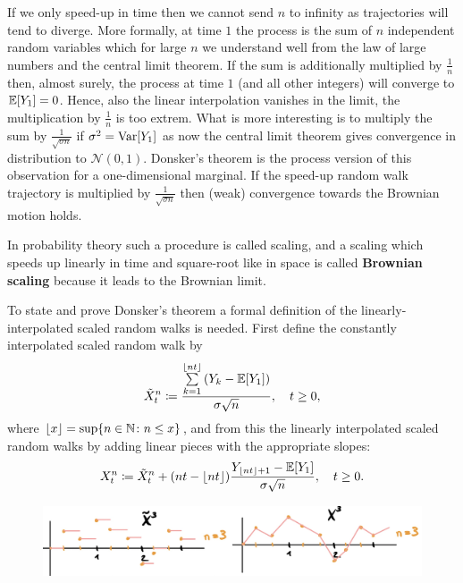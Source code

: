 If we only speed-up in time then we cannot send $n$ to infinity as trajectories will tend to diverge. More formally, at time $1$ the process is the sum of $n$ independent random variables which for large $n$ we understand well from the law of large numbers and the central limit theorem. If the sum is additionally multiplied by $\frac{1}{n}$ then, almost surely, the process at time $1$ (and all other integers) will converge to $\mathbb{E}[Y_1]=0$. Hence, also the linear interpolation vanishes in the limit, the multiplication by $\frac{1}{n}$ is too extrem. What is more interesting is to multiply the sum by $\frac{1}{\sqrt{\sigma n}}$ if $\sigma^2=\operatorname{Var}[Y_1]$ as now the central limit theorem gives convergence in distribution to $\mathcal N(0,1)$. Donsker's theorem is the process version of this observation for a one-dimensional marginal. If the speed-up random walk trajectory is multiplied by $\frac{1}{\sqrt{\sigma n}}$ then (weak) convergence towards the Brownian motion holds. 
\begin{laufmerksamkeit}
	In probability theory such a procedure is called scaling, and a scaling which speeds up linearly in time and square-root like in space is called \textbf{Brownian scaling} because it leads to the Brownian limit. 
\end{laufmerksamkeit}
To state and prove Donsker's theorem a formal definition of the linearly-interpolated scaled random walks is needed. First define the constantly interpolated scaled random walk by
	\begin{align*}
		\tilde{X}_t^n \coloneqq \frac{\sum\limits_{k=1}^{\lfloor nt \rfloor}\left( Y_k - \mathbb{E}[Y_1]\right)}{\sigma \sqrt{n}}, \quad t\geq 0,
	\end{align*}
	where $\lfloor x \rfloor = \sup\{ n\in\mathbb{N}\colon n \leq x\}$,	and from this the linearly interpolated scaled random walks by adding linear pieces with the appropriate slopes:
	\begin{align*}
		X_t^n \coloneqq \tilde{X}_t^n + (nt - \lfloor nt \rfloor ) \frac{Y_{\lfloor nt \rfloor + 1}-\mathbb{E}[Y_1]}{\sigma \sqrt{n}} ,\quad t\geq 0.
	\end{align*}
	\begin{figure}[h]
		\begin{center}
			\includegraphics[scale=0.13]{RWs.jpeg}
		\end{center}
		\end{figure}
